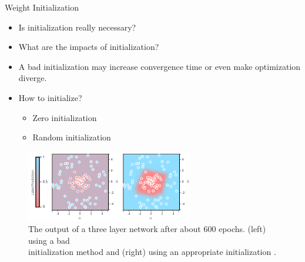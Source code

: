 \documentclass[compress,oilve,t]{beamer}
\begin{document}
\begin{frame}{Weight Initialization}
	\begin{itemize}
		\item Is initialization really necessary?
		\item What are the impacts of initialization?
		\item A bad initialization may increase convergence time or even make optimization diverge.
		\item How to initialize?
		\begin{itemize}
			\item Zero initialization
			\item Random initialization
		\end{itemize}
	\end{itemize}
	\begin{figure}[H]
		\centering
		\includegraphics[width=0.65\textwidth]{Figs/wi-crucial.png}
		\caption{The output of a three layer network after about 600 epochs. (left) using a bad\\ initialization method and (right) using an appropriate initialization \cite{katanforoosh-kunin}.}
	\end{figure}
\end{frame}
\end{document}
